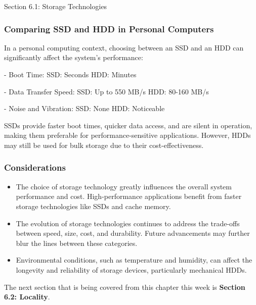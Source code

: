 \begin{notes}{Section 6.1: Storage Technologies}
    \begin{highlight}
        \subsubsection*{Comparing SSD and HDD in Personal Computers}
    
        In a personal computing context, choosing between an SSD and an HDD can significantly affect the system's performance:
    
    \begin{code}[Comparison]
    - Boot Time: 
        SSD: Seconds
        HDD: Minutes
    
    - Data Transfer Speed:
        SSD: Up to 550 MB/s
        HDD: 80-160 MB/s
    
    - Noise and Vibration:
        SSD: None
        HDD: Noticeable
    \end{code}
        SSDs provide faster boot times, quicker data access, and are silent in operation, making them preferable for performance-sensitive applications. However, HDDs may still be used for bulk storage 
        due to their cost-effectiveness.
    \end{highlight}
    
    \subsubsection*{Considerations}
    
    \begin{itemize}
        \item The choice of storage technology greatly influences the overall system performance and cost. High-performance applications benefit from faster storage technologies like SSDs and cache memory.
        \item The evolution of storage technologies continues to address the trade-offs between speed, size, cost, and durability. Future advancements may further blur the lines between these categories.
        \item Environmental conditions, such as temperature and humidity, can affect the longevity and reliability of storage devices, particularly mechanical HDDs.
    \end{itemize}
\end{notes}

The next section that is being covered from this chapter this week is \textbf{Section 6.2: Locality}.


